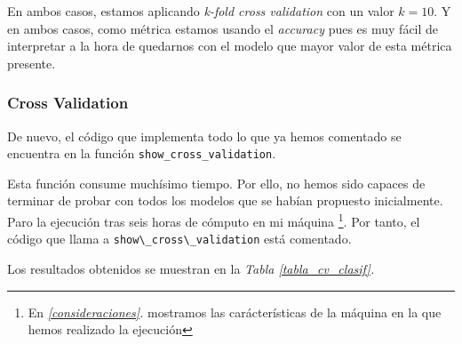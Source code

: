 \documentclass[11pt]{article}
\begin{document}
En ambos casos, estamos aplicando \emph{k-fold cross validation} con un valor $k = 10$. Y en ambos casos, como métrica estamos usando el \emph{accuracy} pues es muy fácil de interpretar a la hora de quedarnos con el modelo que mayor valor de esta métrica presente.

\subsubsection{Cross Validation}

De nuevo, el código que implementa todo lo que ya hemos comentado se encuentra en la función \lstinline{show_cross_validation}.

Esta función consume muchísimo tiempo. Por ello, no hemos sido capaces de terminar de probar con todos los modelos que se habían propuesto inicialmente. Paro la ejecución tras seis horas de cómputo en mi máquina \footnote{En \emph{\ref{consideraciones}. } mostramos las carácterísticas de la máquina en la que hemos realizado la ejecución}. Por tanto, el código que llama a \lstinline{show\_cross\_validation} está comentado.


Los resultados obtenidos se muestran en la \emph{Tabla \ref{tabla_cv_clasif}. }
\end{document}
